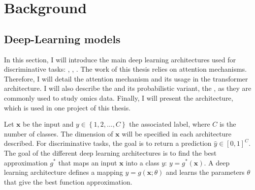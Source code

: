 \documentclass[../main.tex]{subfiles}
\begin{document}
\chapter{Background}\label{chap:background}
\minitocpagecentered

\section{Deep-Learning models}
	In this section, I will introduce the main deep learning architectures used for discriminative tasks: , , .
	The work of this thesis relies on attention mechanisms.
	Therefore, I will detail the attention mechanism and its usage in the transformer architecture.
	I will also describe the  and its probabilistic variant, the , as they are commonly used to study omics data.
	Finally, I will present the  architecture, which is used in one project of this thesis.

	Let \(\symbf{x}\) be the input and \(y \in \left\{1,2, \ldots, C \right\} \) the associated label, where \(C\) is the number of classes.
	The dimension of \(\symbf{x}\) will be specified in each architecture described.
	For discriminative tasks, the goal is to return a prediction \(\hat{y} \in {\left[0,1\right]}^C\).
	The goal of the different deep learning architectures is to find the best approximation \(g^{*}\) that maps an input \(\symbf{x}\) into a class \(y\): \(y = g^{*}\left(\symbf{x}\right)\).
	A deep learning architecture defines a mapping \(y=g\left(\symbf{x}; \theta\right)\) and learns the parameters \(\theta\) that give the best function approximation.
	\vspace{-1\baselineskip}
\end{document}
